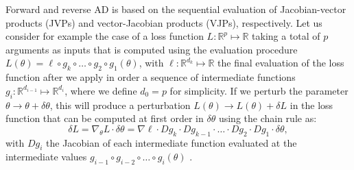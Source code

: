 
Forward and reverse AD is based on the sequential evaluation of Jacobian-vector products (JVPs) and vector-Jacobian products (VJPs), respectively. 
Let us consider for example the case of a loss function $L : \mathbb R^p \mapsto \mathbb R$ taking a total of $p$ arguments as inputs that is computed using the evaluation procedure $L(\theta) = \ell \circ g_{k} \circ \ldots \circ g_2 \circ g_1(\theta)$, with $\ell : \mathbb R^{d_k} \mapsto \mathbb R$ the final evaluation of the loss function after we apply in order a sequence of intermediate functions $g_i : \mathbb R^{d_{i-1}} \mapsto \mathbb R^{d_i}$, where we define $d_0 = p$ for simplicity. 
If we perturb the parameter $\theta \rightarrow \theta + \delta \theta$, this will produce a perturbation $L (\theta) \rightarrow L(\theta) + \delta L$ in the loss function that can be computed at first order in $\delta \theta$ using the chain rule as: 
\begin{equation}
     \delta L = \nabla_\theta L \cdot \delta \theta = \nabla \ell \cdot Dg_{k} \cdot Dg_{k-1} \cdot \ldots \cdot Dg_2 \cdot Dg_1 \cdot \delta \theta , 
    \label{eq:deltaL}
\end{equation}
with $Dg_i$ the Jacobian of each intermediate function evaluated at the intermediate values $g_{i-1} \circ g_{i-2} \circ \ldots \circ g_i (\theta)$ \cite{Giering_Kaminski_1998}.

